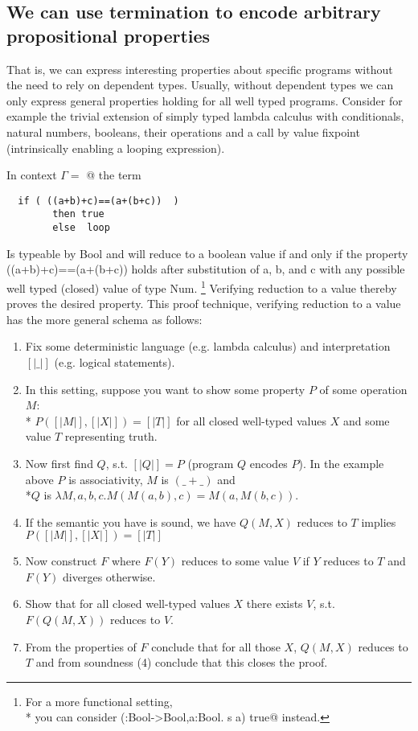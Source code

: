 \documentclass[runningheads]{llncs}
\begin{document}
\subsection{We can use termination to encode arbitrary propositional properties}

That is, we can express interesting properties about specific programs without the need to rely on dependent types. Usually, without dependent types we can only express general properties holding for all well typed programs.
Consider for example the trivial extension of simply typed lambda calculus with conditionals, natural numbers, booleans, their operations and a call by value fixpoint (intrinsically enabling a looping expression).

In context $\Gamma = $ @ the term
\begin{lstlisting}
  if ( ((a+b)+c)==(a+(b+c))  )
        then true
        else  loop
\end{lstlisting}
Is typeable by Bool and will reduce to a boolean value if and only if the property ((a+b)+c)==(a+(b+c)) holds after substitution of a, b, and c with any possible well typed (closed) value of type Num.
\footnote{For a more functional setting,\\* you can consider \Q@fix (\s:Bool->Bool,a:Bool. s a)  true@ instead.}
Verifying reduction to a value thereby proves the desired property.
This proof technique, verifying reduction to a value has the more general schema as follows:
\begin{enumerate}
\item Fix some deterministic language (e.g. lambda calculus) and interpretation $[| \_  |]$ (e.g. logical statements).
\item In this setting, suppose you want to show some property $P$ of some operation $M$:
\\* $P([|M|], [|X|]) = [|T|]$
for all closed well-typed values $X$ and some value $T$ representing truth.

\item Now first find $Q$, s.t. $[|Q|] = P$ (program $Q$ encodes $P$). 
In the example above $P$ is associativity, $M$ is $(\_+\_)$ and 
\\*$Q$ is  $\lambda M, a, b, c . M(M(a,b),c)=M(a,M(b,c))$.
\item If the semantic you have is sound, we have
$Q(M, X)$ reduces to $T$ implies $P([|M|], [|X|]) = [|T|]$

\item Now construct $F$ where $F(Y)$ reduces to some value $V$ if $Y$ reduces to $T$ and $F(Y)$ diverges otherwise.
\item Show that for all closed well-typed values $X$ there exists $V$, s.t. $F(Q(M, X))$ reduces to $V$.
\item From the properties of $F$ conclude that for all those $X$, $Q(M, X)$ reduces to $T$ and from soundness (4) conclude that this closes the proof.

\end{enumerate}
\end{document}
